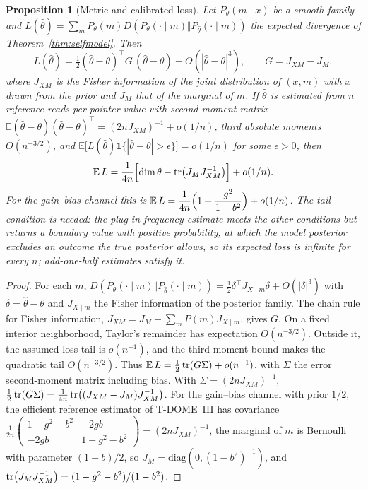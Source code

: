 \documentclass[12pt]{article}
\newtheorem{proposition}[theorem]{Proposition}
\begin{document}
\begin{proposition}[Metric and calibrated loss]
\label{prop:calibration}
Let $P_\theta(m\mid x)$ be a smooth family and $L(\hat\theta)=\sum_mP_\theta(m)D(P_\theta(\cdot\mid m)\Vert P_{\hat\theta}(\cdot\mid m))$ the expected divergence of Theorem~\ref{thm:selfmodel}. Then
\[
L(\hat\theta)=\tfrac12(\hat\theta-\theta)^{\!\top}G\,(\hat\theta-\theta)+O(|\hat\theta-\theta|^3),\qquad G=J_{XM}-J_M,
\]
where $J_{XM}$ is the Fisher information of the joint distribution of $(x,m)$ with $x$ drawn from the prior and $J_M$ that of the marginal of $m$. If $\hat\theta$ is estimated from $n$ reference reads per pointer value with second-moment matrix $\mathbb E(\hat\theta-\theta)(\hat\theta-\theta)^{\!\top}=(2nJ_{XM})^{-1}+o(1/n)$, third absolute moments $O(n^{-3/2})$, and $\mathbb E\bigl[L(\hat\theta)\mathbf 1\{|\hat\theta-\theta|>\epsilon\}\bigr]=o(1/n)$ for some $\epsilon>0$, then
\[
\mathbb E\,L=\frac1{4n}\Bigl[\dim\theta-\tr\bigl(J_MJ_{XM}^{-1}\bigr)\Bigr]+o(1/n).
\]
For the gain--bias channel this is $\mathbb E\,L=\dfrac{1}{4n}\Bigl(1+\dfrac{g^2}{1-b^2}\Bigr)+o(1/n)$. The tail condition is needed: the plug-in frequency estimate meets the other conditions but returns a boundary value with positive probability, at which the model posterior excludes an outcome the true posterior allows, so its expected loss is infinite for every $n$; add-one-half estimates satisfy it.
\end{proposition}

\begin{proof}
For each $m$, $D(P_\theta(\cdot\mid m)\Vert P_{\hat\theta}(\cdot\mid m))=\tfrac12\delta^{\top}J_{X\mid m}\delta+O(|\delta|^3)$ with $\delta=\hat\theta-\theta$ and $J_{X\mid m}$ the Fisher information of the posterior family. The chain rule for Fisher information, $J_{XM}=J_M+\sum_mP(m)J_{X\mid m}$, gives $G$. On a fixed interior neighborhood, Taylor's remainder has expectation $O(n^{-3/2})$. Outside it, the assumed loss tail is $o(n^{-1})$, and the third-moment bound makes the quadratic tail $O(n^{-3/2})$. Thus $\mathbb E\,L=\tfrac12\tr(G\Sigma)+o(n^{-1})$, with $\Sigma$ the error second-moment matrix including bias. With $\Sigma=(2nJ_{XM})^{-1}$, $\tfrac12\tr(G\Sigma)=\tfrac1{4n}\tr\bigl((J_{XM}-J_M)J_{XM}^{-1}\bigr)$. For the gain--bias channel with prior $1/2$, the efficient reference estimator of T-DOME~III has covariance $\tfrac1{2n}\begin{pmatrix}1-g^2-b^2&-2gb\\-2gb&1-g^2-b^2\end{pmatrix}=(2nJ_{XM})^{-1}$, the marginal of $m$ is Bernoulli with parameter $(1+b)/2$, so $J_M=\mathrm{diag}(0,(1-b^2)^{-1})$, and $\tr(J_MJ_{XM}^{-1})=(1-g^2-b^2)/(1-b^2)$.
\end{proof}
\end{document}
